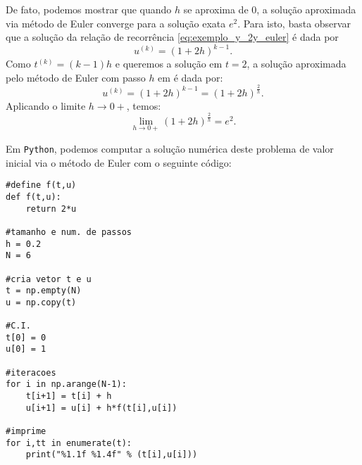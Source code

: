 \begin{ex}
De fato, podemos mostrar que quando $h$ se aproxima de $0$, a solução aproximada via método de Euler converge para a solução exata $e^2$. Para isto, basta observar que a solução da relação de recorrência \eqref{eq:exemplo_y_2y_euler} é dada por
 \begin{equation} u^{(k)}=(1+2h)^{k-1}. \end{equation}
 Como $t^{(k)}=(k-1)h$ e queremos a solução em $t=2$, a solução aproximada pelo método de Euler com passo $h$ em é dada por:
 \begin{equation}
 u^{(k)}= (1+2h)^{k-1}= (1+2h)^{\frac{2}{h}}.
 \end{equation}
Aplicando o limite $h\to 0+$, temos:
  \begin{equation}
  \lim_{h\to 0+} (1+2h)^{\frac{2}{h}}= e^{2}.
  \end{equation}

\ifispython
Em \verb+Python+, podemos computar a solução numérica deste problema de valor inicial via o método de Euler com o seguinte código:
\begin{verbatim}
#define f(t,u)
def f(t,u):
    return 2*u

#tamanho e num. de passos
h = 0.2
N = 6

#cria vetor t e u
t = np.empty(N)
u = np.copy(t)

#C.I.
t[0] = 0
u[0] = 1

#iteracoes
for i in np.arange(N-1):
    t[i+1] = t[i] + h
    u[i+1] = u[i] + h*f(t[i],u[i])

#imprime
for i,tt in enumerate(t):
    print("%1.1f %1.4f" % (t[i],u[i]))
\end{verbatim}
\fi
\end{ex}


